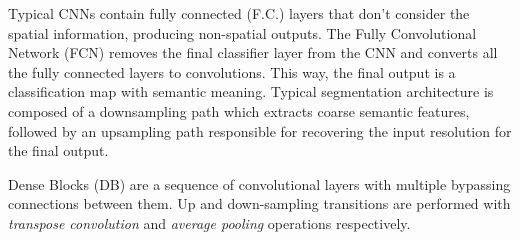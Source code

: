 Typical CNNs contain fully connected (F.C.) layers that don't consider the spatial information, producing non-spatial outputs. The Fully Convolutional Network (FCN) removes the final classifier layer from the CNN and converts all the fully connected layers to convolutions. This way, the final output is a classification map with semantic meaning. Typical segmentation architecture is composed of a downsampling path which extracts coarse semantic features, followed by an upsampling path responsible for recovering the input resolution for the final output. 

Dense Blocks (DB)  are  a  sequence  of  convolutional  layers  with  multiple bypassing connections between them. Up and down-sampling transitions  are  performed  with \textit{transpose convolution} and \textit{average pooling} operations respectively.

